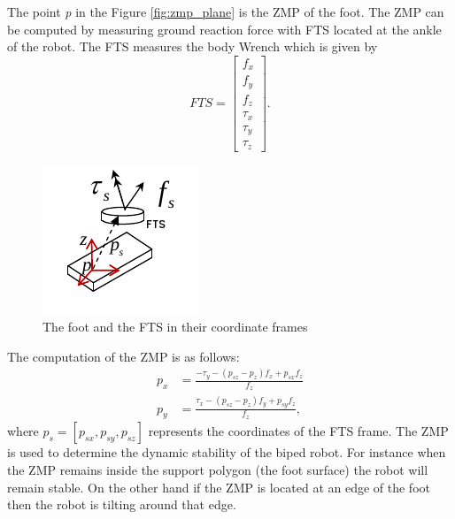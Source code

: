 The point \emph{p} in the Figure \ref{fig:zmp_plane} is the ZMP of the foot. The ZMP can be computed by measuring ground reaction force with FTS located at the ankle of the robot. The FTS measures the body Wrench which is given by $$ FTS = \begin{bmatrix}
f_x \\ f_y \\ f_z\\ \tau_x \\ \tau_y \\ \tau_z
\end{bmatrix}.$$ 
\begin{figure}
	\centering
	\includegraphics[scale=1]{Bilder/zmp_pic.png}
	\caption{The foot and the FTS in their coordinate frames}
\end{figure}

The computation of the ZMP is as follows:
\begin{equation}
	\begin{split}
	p_x &= \frac{-\tau_y -(p_{sz}-p_{z})f_x+p_{sx}f_z}{f_z}\\
	p_y &= \frac{\tau_x -(p_{sz}-p_{z})f_y+p_{sy}f_z}{f_z},
	\end{split}
\end{equation}
where $p_s = [p_{sx},p_{sy},p_{sz}]$ represents the coordinates of the FTS frame. The ZMP is used to determine the dynamic stability of the biped robot. For instance when the ZMP remains inside the support polygon (the foot surface) the robot will remain stable. On the other hand if the ZMP is located at an edge of the foot then the robot is tilting around that edge.